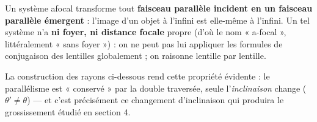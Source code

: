 \documentclass[11pt]{article}
\begin{document}
\begin{propriete}
Un système afocal transforme tout \textbf{faisceau parallèle incident en un faisceau parallèle émergent} : l'image d'un objet à l'infini est elle-même à l'infini. Un tel système n'a \textbf{ni foyer, ni distance focale} propre (d'où le nom « a-focal », littéralement « sans foyer ») : on ne peut pas lui appliquer les formules de conjugaison des lentilles globalement ; on raisonne lentille par lentille.
\end{propriete}

La construction des rayons ci-dessous rend cette propriété évidente : le parallélisme est « conservé » par la double traversée, seule l'\emph{inclinaison} change ($\theta' \neq \theta$) — et c'est précisément ce changement d'inclinaison qui produira le grossissement étudié en section 4.
\end{document}
